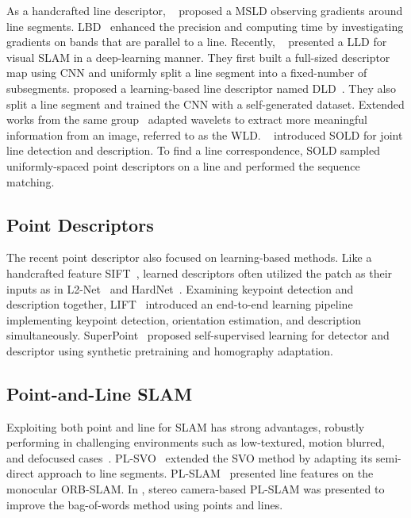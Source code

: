 \documentclass[letterpaper, 10 pt, journal, twoside]{ieeetran}
\begin{document}
As a handcrafted line descriptor, \citeauthor{MSLD2009}~\cite{MSLD2009} proposed a \ac{MSLD} observing gradients around line segments. \ac{LBD}~\cite{LBD2013} enhanced the precision and computing time by investigating gradients on bands that are parallel to a line. Recently, \citeauthor{LLD2019}~\cite{LLD2019} presented a \ac{LLD} for visual \ac{SLAM} in a deep-learning manner. They first built a full-sized descriptor map using \ac{CNN} and uniformly split a line segment into a fixed-number of subsegments. \citeauthor{DLD2019} proposed a learning-based line descriptor named DLD~\cite{DLD2019}. They also split a line segment and trained the \ac{CNN} with a self-generated dataset. Extended works from the same group~\cite{WLD2020} adapted wavelets to extract more meaningful information from an image, referred to as the \ac{WLD}. \citeauthor{Pautrat2021}~\cite{Pautrat2021} introduced SOLD for joint line detection and description. To find a line correspondence, SOLD sampled uniformly-spaced point descriptors on a line and performed the sequence matching.

\subsection{Point Descriptors}

The recent point descriptor also focused on learning-based methods. Like a handcrafted feature SIFT~\cite{Lowe2004}, learned descriptors often utilized the patch as their inputs as in L2-Net~\cite{Tian2017} and HardNet~\cite{Mishchuk2017}. Examining keypoint detection and description together, LIFT~\cite{Yi2016} introduced an end-to-end learning pipeline implementing keypoint detection, orientation estimation, and description simultaneously. SuperPoint~\cite{DeTone2017} proposed self-supervised learning for detector and descriptor using synthetic pretraining and homography adaptation.








\subsection{Point-and-Line \ac{SLAM}}

Exploiting both point and line for \ac{SLAM} has strong advantages, robustly performing in challenging environments such as low-textured, motion blurred, and defocused cases~\cite{Gomez2016, Pumarola2017, Gomez2019, Yang2019}. PL-SVO~\cite{Gomez2016} extended the SVO method by adapting its semi-direct approach to line segments. PL-SLAM~\cite{Pumarola2017} presented line features on the monocular ORB-SLAM. In \cite{Gomez2019}, stereo camera-based PL-SLAM was presented to improve the bag-of-words method using points and lines.
\end{document}
